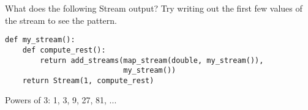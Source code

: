 \question What does the following Stream output? Try writing out the
first few values of the stream to see the pattern.

\begin{lstlisting}
def my_stream():
    def compute_rest():
        return add_streams(map_stream(double, my_stream()),
                           my_stream())
    return Stream(1, compute_rest)
\end{lstlisting}
\begin{solution}[2cm]
Powers of 3: 1, 3, 9, 27, 81, ...
\end{solution}

